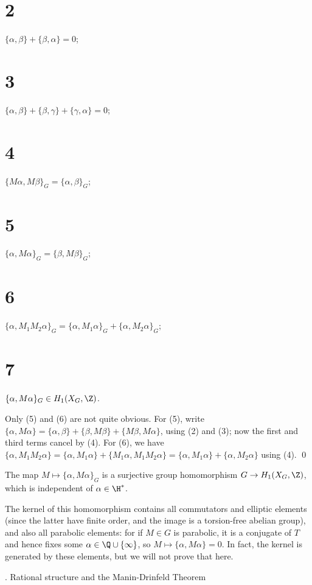 \part{2} $\{\alpha,\beta\} + \{\beta,\alpha\} = 0$;
\part{3} $\{\alpha,\beta\} + \{\beta,\gamma\} + \{\gamma,\alpha\} = 0$;
\part{4} $\{M\alpha,M\beta\}_G = \{\alpha,\beta\}_G$;
\part{5} $\{\alpha,M\alpha\}_G = \{\beta,M\beta\}_G$;
\part{6} $\{\alpha,M_1M_2\alpha\}_G = \{\alpha,M_1\alpha\}_G +
\{\alpha,M_2\alpha\}_G$; 
\part{7} $\{\alpha,M\alpha\}_G \in H_1(X_G,\Z)$.

\endproclaim

 Only (5) and (6) are not quite obvious. For (5), write  
$\{\alpha,M\alpha\}=\{\alpha,\beta\}+\{\beta,M\beta\}+\{M\beta,M\alpha\}$,
using (2) and (3); now the first and third terms cancel by (4).  For (6), we
have $\{\alpha,M_1M_2\alpha\} = \{\alpha,M_1\alpha\} +
\{M_1\alpha,M_1M_2\alpha\} = \{\alpha,M_1\alpha\} +
\{\alpha,M_2\alpha\}$ using (4).
\qed
\enddemo

\newprop{\homhom}
The map $M\mapsto\{\alpha,M\alpha\}_G$ is
a surjective group homomorphism $G\to H_1(X_G,\Z)$, which is independent of
$\alpha\in\H^*$.
\endproclaim

The kernel of this homomorphism contains all commutators and elliptic
elements (since the latter have finite order, and the image is a
torsion-free abelian group), and also all parabolic elements: for if
$M\in G$ is parabolic, it is a conjugate of $T$ and hence fixes some
$\alpha\in\Q\cup\{\infty\}$, so $M\mapsto\{\alpha,M\alpha\}=0$.  In
fact, the kernel is generated by these elements, but we will not prove
that here.

\beginsubsection{\ratstruc}
\subhead \ratstruc. Rational structure and the Manin-Drinfeld Theorem \endsubhead

